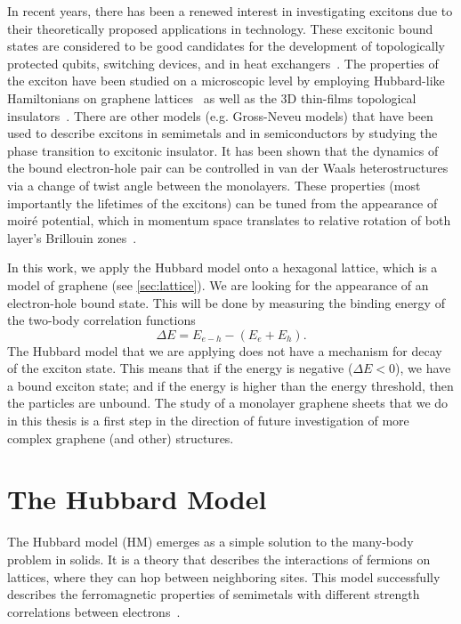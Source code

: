 In recent years, there has been a renewed interest in investigating excitons due to their theoretically proposed applications in technology. These excitonic bound states are considered to be good candidates for the development of topologically protected qubits, switching devices, and in heat exchangers~\cite{graphapl1, graphapl2, graphapl3}. The properties of the exciton have been studied on a microscopic level by employing Hubbard-like Hamiltonians on graphene lattices~\cite{graphene1, graphene2} as well as the 3D thin-films topological insulators~\cite{graphene3, graphene4, graphene5}. There are other models (e.g. Gross-Neveu models) that have been used to describe excitons in semimetals and in semiconductors by studying the phase transition to excitonic insulator. It has been shown that the dynamics of the bound electron-hole pair can be controlled in van der Waals heterostructures via a change of twist angle between the monolayers. These properties (most importantly the lifetimes of the excitons) can be tuned from the appearance of moiré potential, which in momentum space translates to relative rotation of both layer's Brillouin zones~\cite{twistangle}.

In this work, we apply the Hubbard model onto a hexagonal lattice, which is a model of graphene (see \cref{sec:lattice}). We are looking for the appearance of an electron-hole bound state. This will be done by measuring the binding energy of the two-body correlation functions
\begin{equation}
    \Delta E = E_{e-h} - (E_e + E_h).
    \label{eq:binding_energy}
\end{equation}
The Hubbard model that we are applying does not have a mechanism for decay of the exciton state. This means that if the energy is negative ($\Delta E < 0$), we have a bound exciton state; and if the energy is higher than the energy threshold, then the particles are unbound. The study of a monolayer graphene sheets that we do in this thesis is a first step in the direction of future investigation of more complex graphene (and other) structures.

\section{The Hubbard Model}

The Hubbard model (HM) emerges as a simple solution to the many-body problem in solids. It is a theory that describes the interactions of fermions on lattices, where they can hop between neighboring sites. This model successfully describes the ferromagnetic properties of semimetals with different strength correlations between electrons~\cite{hubex1, hubex2}. %

